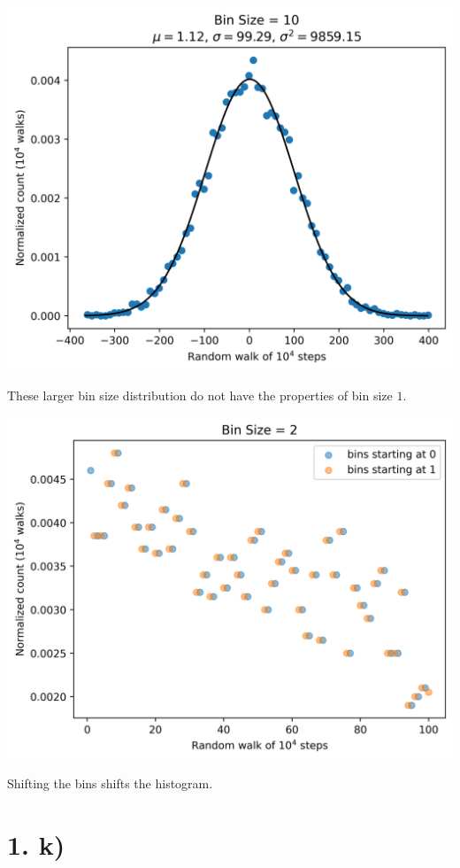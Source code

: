 \documentclass{article}
\begin{document}
\begin{center}
    \includegraphics[scale=0.8]{1ij_dx_10.png}
\end{center}

These larger bin size distribution do not have the properties of bin size $1$.

\begin{center}
    \includegraphics[scale=0.8]{1ij_shifted.png}
\end{center}

Shifting the bins shifts the histogram.

\section*{1. k)}
\end{document}
